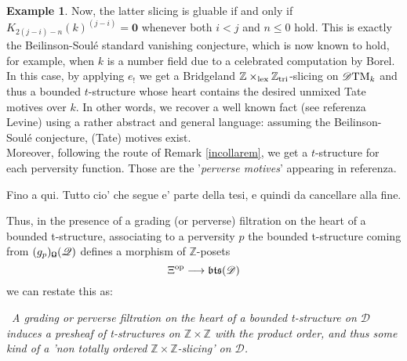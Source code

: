 \documentclass{article}
\theoremstyle{definition}
\newtheorem{exmp}[thm]{Example}
\newcommand{\Z}{\mathbb{Z}}
\newcommand{\lex}{\times_{\textnormal{lex}}}
\newcommand{\triv}{\mathbb{Z}_{\textnormal{tri}}}
\begin{document}
\begin{exmp}
   Now, the latter slicing is gluable if and only if  $K_{2(j-i)-n}(k)^{(j-i)} = \mathbf{0}$  whenever both $i < j$ and $n \leq 0$ hold. This is exactly the Beilinson-Soul\'e standard vanishing conjecture, which is now known to hold, for example, when $k$ is a number field due to a celebrated computation by Borel. In this case, by applying $e_!$ we get a Bridgeland $\Z \lex \triv$-slicing on $\mathscr{D}\textnormal{TM}_k$ and thus a bounded $t$-structure whose heart contains the desired unmixed Tate motives over $k$. In other words, we recover a well known fact (see {\color{red} referenza Levine}) using a rather abstract and general language: assuming the Beilinson-Soul\'e conjecture, (Tate) motives exist. \\
   Moreover, following the route of Remark \ref{incollarem}, we get a $t$-structure for each perversity function. Those are the '\textit{perverse motives}' appearing in {\color{red} referenza}. 
\end{exmp} 


{\Huge Fino a qui. Tutto cio' che segue e' parte della tesi, e quindi da cancellare alla fine.} 




Thus, in the presence of a grading (or perverse) filtration on the heart of a bounded t-structure, associating to a perversity $p$ the bounded t-structure coming from $(g_p)_{\textnormal{\Libra}}(\mathscr{Q})$ defines a morphism of $\mathbb{Z}$-posets $$\Xi^{\textnormal{op}} \longrightarrow \mathfrak{bts}(\mathscr{D})$$
we can restate this as: 

\begin{center}
\twonotes \ \textit{A grading or perverse filtration on the heart of a bounded t-structure on $\mathscr{D}$ induces a presheaf of t-structures on $\mathbb{Z} \times \mathbb{Z}$ with the product order, and thus some kind of a 'non totally ordered $\mathbb{Z} \times \mathbb{Z}$-slicing' on $\mathscr{D}$.}
\end{center}
\end{document}
